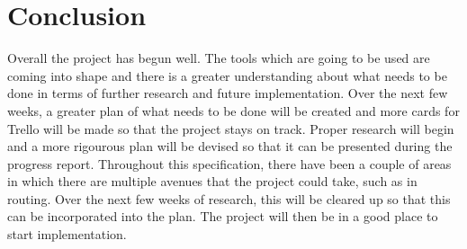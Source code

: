 \documentclass{report}
\begin{document}
\chapter*{Conclusion}

Overall the project has begun well. The tools which are going to be used are coming into shape and there is a greater 
understanding about what needs to be done in terms of further research and future implementation. Over the next few 
weeks, a greater plan of what needs to be done will be created and more cards for Trello will be made so that the 
project stays on track. Proper research will begin and a more rigourous plan will be devised 
so that it can be presented during the progress report. Throughout this specification, there have been a couple of areas 
in which there are multiple avenues that the project could take, such as in routing. Over the next few weeks of 
research, this will be cleared up so that this can be incorporated into the plan. The project will then be in 
a good place to start implementation.


{}

\end{document}
